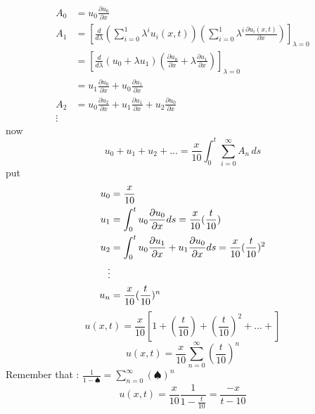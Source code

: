 \documentclass[]{article}
\begin{document}
\begin{align*}
    A_0 &= u_0\frac{\partial u_0}{\partial x}
    \\
    A_1 &= \left[\frac{d}{d \lambda} \left(\sum_{i=0}^{1}  \lambda^i u_i(x,t)\right)\left(\sum_{i=0}^{1}  \lambda^i \frac{\partial u_i(x,t)}{\partial x}\right)\right]_{\lambda = 0}
    \\
    &= \left[\frac{d}{d \lambda} \left(u_0 + \lambda u_1 \right)\left(\frac{\partial u_0}{\partial x} + \lambda\frac{\partial u_1}{\partial x}\right)\right]_{\lambda = 0}
    \\
    &= u_1 \frac{\partial u_0}{\partial x} + u_0 \frac{\partial u_1}{\partial x}
    \\
    A_2 &= u_0 \frac{\partial u_2}{\partial x} + u_1 \frac{\partial u_1}{\partial x} + u_2 \frac{\partial u_0}{\partial x}
    \\
    \vdots
\end{align*}
now 
\[
u_0 + u_1 + u_2+\dots = \frac{x}{10} \int_{0}^{t} \sum_{i=0}^{\infty} A_n  \,ds
\]
put 
\begin{align*}
    u_0 &=  \frac{x}{10}
    \\
    u_1 &= \int_{0}^{t} u_0 \pdv{u_0}{x}ds =\frac{x}{10} (\frac{t}{10})
    \\
    u_2 &= \int_{0}^{t}u_0 \pdv{u_1}{x} + u_1 \pdv{u_0}{x}ds = \frac{x}{10} (\frac{t}{10})^2
    \\
    \vdots
    \\
    u_n &= \frac{x}{10} (\frac{t}{10})^n
\end{align*}
$$u(x,t) = \frac{x}{10}\left[1 +\left(\frac{t}{10}\right) +\left(\frac{t}{10}\right)^2 +\dots + \right] $$
$$u(x,t) = \frac{x}{10}\sum_{n=0}^{\infty} \left(\frac{t}{10}\right)^n  $$
Remember that : $\frac{1}{1-\spadesuit} = \sum_{n=0}^{\infty} \left(\spadesuit\right)^n$
$$u(x,t) = \frac{x}{10}\frac{1}{1-\frac{t}{10}} = \frac{-x}{t-10}$$
\end{document}
